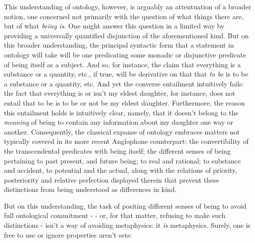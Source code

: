 \documentclass[]{article}
\begin{document}
This understanding of ontology, 
however, 
is arguably 
an attentuation of a broader notion,
one concerned not primarily with the question of what things there are, but of what \emph{being is}. 
One might answer this question in a limited way by providing a universally quantified disjunction of the aforementioned kind. 
But on this broader understanding, 
the principal syntactic form that a statement in ontology will take will be one predicating some monadic or disjunctive predicate of being itself as a subject. 
And so, for instance, the claim that everything is a substance or a quantity, etc., 
if true, 
will be derivative on that that \emph{to be} is to be a substance or a quantity, etc.
And yet the converse entailment intuitively fails: 
the fact that everything is or isn't my eldest daughter, for instance, 
does not entail that to be is to be or not be my eldest daughter. 
Furthermore, the reason this entailment holds is intuitively clear, 
namely, 
that it doesn't belong to the \emph{meaning} of being to contain any information about my daughter one way or another. 
Consequently, the classical expanse of ontology embraces matters not typically covered in its more recent Anglophone counterpart: 
the convertibility of the transcendental predicates with being itself;  
the different senses of being pertaining 
to past present, and future being;
to real and rational;
to substance and accident, 
to potential and the actual, 
along with the relations of priority, posteriority and relative perfection displayed therein
that prevent these distinctions from being understood as differences in kind. 

But on this understanding, the task of positing different senses of being to avoid full ontological commitment - 
- or, for that matter, refusing to make such distinctions - 
isn't a way of avoiding metaphysics: it \emph{is} metaphysics.
Surely, one is free to use or ignore 
properties aren't sets: 
\end{document}
